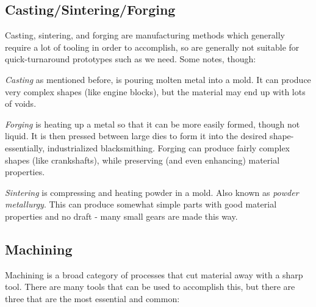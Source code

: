 \documentclass[10pt,letterpaper]{book}
\begin{document}
 \subsection{Casting/Sintering/Forging}
 
 Casting, sintering, and forging are manufacturing methods which generally require a lot of tooling in order to accomplish, so are generally not suitable for quick-turnaround prototypes such as we need. Some notes, though:
 
 \begin{asparaitem}
 	\item \textit{Casting} as mentioned before, is pouring molten metal into a mold. It can produce very complex shapes (like engine blocks), but the material may end up with lots of voids.
 	\item \textit{Forging} is heating up a metal so that it can be more easily formed, though not liquid. It is then pressed between large dies to form it into the desired shape- essentially, industrialized blacksmithing. Forging can produce fairly complex shapes (like crankshafts), while preserving (and even enhancing) material properties.
 	\item \textit{Sintering} is compressing and heating powder in a mold. Also known as \textit{powder metallurgy}. This can produce somewhat simple parts with good material properties and no draft - many small gears are made this way.
 \end{asparaitem}
 
 \subsection{Machining}
 
 Machining is a broad category of processes that cut material away with a sharp tool. There are many tools that can be used to accomplish this, but there are three that are the most essential and common:
 
\end{document}
